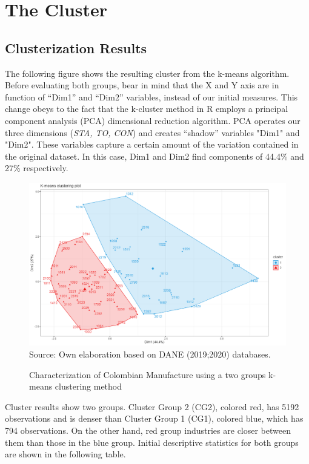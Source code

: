 \documentclass[12pt,a4paper]{article}
\begin{document}
\section{The Cluster}
\subsection{Clusterization Results}

The following figure shows the resulting cluster from the k-means algorithm. Before evaluating both groups, bear in mind that the X and Y axis are in function of “Dim1” and “Dim2” variables, instead of our initial measures. This change obeys to the fact that the k-cluster method in R employs a principal component analysis (PCA) dimensional reduction algorithm. PCA operates our three dimensions (\textit{STA, TO, CON}) and creates “shadow” variables "Dim1" and "Dim2". These variables capture a certain amount of the variation contained in the original dataset. In this case, Dim1 and Dim2 find components of 44.4\% and 27\% respectively. 

\begin{figure}[H]	
	\caption{Characterization of Colombian Manufacture using a two groups k-means clustering method}
	\centering
	\includegraphics[scale = 0.45]{cluster.png}
	Source: Own elaboration based on DANE (2019;2020) databases.
\end{figure}



Cluster results show two groups. Cluster Group 2 (CG2), colored red, has 5192 observations and is denser than Cluster Group 1 (CG1), colored blue, which has 794 observations. On the other hand, red group industries are closer between them than those in the blue group. Initial descriptive statistics for both groups are shown in the following table. 
\end{document}
